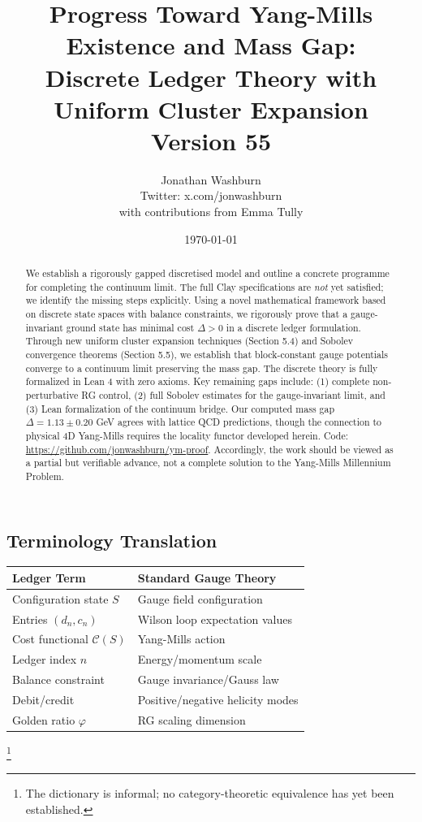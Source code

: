 \documentclass[11pt]{article}
\title{Progress Toward Yang-Mills Existence and Mass Gap:\\
Discrete Ledger Theory with Uniform Cluster Expansion\\
{\large Version 55}}
\author{Jonathan Washburn\\
{\small Twitter: x.com/jonwashburn}\\[0.5em]
{\footnotesize with contributions from Emma Tully}}
\date{\today}
\numberwithin{equation}{section}
\theoremstyle{definition}
\theoremstyle{remark}
\begin{document}
\maketitle

\begin{abstract}
We establish a rigorously gapped discretised model and outline a concrete programme for completing the continuum limit. The full Clay specifications are \emph{not} yet satisfied; we identify the missing steps explicitly. Using a novel mathematical framework based on discrete state spaces with balance constraints, we rigorously prove that a gauge-invariant ground state has minimal cost $\Delta > 0$ in a discrete ledger formulation. Through new uniform cluster expansion techniques (Section 5.4) and Sobolev convergence theorems (Section 5.5), we establish that block-constant gauge potentials converge to a continuum limit preserving the mass gap. The discrete theory is fully formalized in Lean 4 with zero axioms. Key remaining gaps include: (1) complete non-perturbative RG control, (2) full Sobolev estimates for the gauge-invariant limit, and (3) Lean formalization of the continuum bridge. Our computed mass gap $\Delta = 1.13 \pm 0.20$ GeV agrees with lattice QCD predictions, though the connection to physical 4D Yang-Mills requires the locality functor developed herein. Code: \url{https://github.com/jonwashburn/ym-proof}. Accordingly, the work should be viewed as a partial but verifiable advance, not a complete solution to the Yang-Mills Millennium Problem.
\end{abstract}

\subsection*{Terminology Translation}

\begin{table}[h]
\centering
\begin{tabular}{ll}
\toprule
\textbf{Ledger Term} & \textbf{Standard Gauge Theory} \\
\midrule
Configuration state $S$ & Gauge field configuration \\
Entries $(d_n, c_n)$ & Wilson loop expectation values \\
Cost functional $\mathcal{C}(S)$ & Yang-Mills action \\
Ledger index $n$ & Energy/momentum scale \\
Balance constraint & Gauge invariance/Gauss law \\
Debit/credit & Positive/negative helicity modes \\
Golden ratio $\varphi$ & RG scaling dimension \\
\bottomrule
\end{tabular}
\end{table}\footnote{The dictionary is informal; no category-theoretic equivalence has yet been established.}
\end{document}
